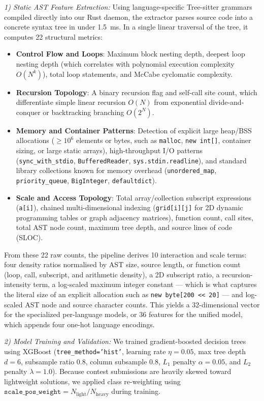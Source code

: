\documentclass[conference]{IEEEtran}
\begin{document}
\textit{1) Static AST Feature Extraction:} Using language-specific Tree-sitter grammars compiled directly into our Rust daemon, the extractor parses source code into a concrete syntax tree in under 1.5~ms. In a single linear traversal of the tree, it computes 22 structural metrics:
\begin{itemize}
    \item \textbf{Control Flow and Loops}: Maximum block nesting depth, deepest loop nesting depth (which correlates with polynomial execution complexity $O(N^k)$), total loop statements, and McCabe cyclomatic complexity.
    \item \textbf{Recursion Topology}: A binary recursion flag and self-call site count, which differentiate simple linear recursion $O(N)$ from exponential divide-and-conquer or backtracking branching $O(2^N)$.
    \item \textbf{Memory and Container Patterns}: Detection of explicit large heap/BSS allocations ($\ge 10^6$ elements or bytes, such as \texttt{malloc}, \texttt{new int[]}, container sizing, or large static arrays), high-throughput I/O patterns (\texttt{sync\_with\_stdio}, \texttt{BufferedReader}, \texttt{sys.stdin.readline}), and standard library collections known for memory overhead (\texttt{unordered\_map}, \texttt{priority\_queue}, \texttt{BigInteger}, \texttt{defaultdict}).
    \item \textbf{Scale and Access Topology}: Total array/collection subscript expressions (\texttt{a[i]}), chained multi-dimensional indexing (\texttt{grid[i][j]} for 2D dynamic programming tables or graph adjacency matrices), function count, call sites, total AST node count, maximum tree depth, and source lines of code (SLOC).
\end{itemize}
From these 22 raw counts, the pipeline derives 10 interaction and scale terms: four density ratios normalised by AST size, source length, or function count (loop, call, subscript, and arithmetic density), a 2D subscript ratio, a recursion-intensity term, a log-scaled maximum integer constant --- which is what captures the literal size of an explicit allocation such as \texttt{new byte[200 << 20]} --- and log-scaled AST node and source character counts. This yields a 32-dimensional vector for the specialized per-language models, or 36 features for the unified model, which appends four one-hot language encodings.

\textit{2) Model Training and Validation:}
We trained gradient-boosted decision trees using XGBoost (\texttt{tree\_method='hist'}, learning rate $\eta = 0.05$, max tree depth $d = 6$, subsample ratio $0.8$, column subsample $0.8$, $L_1$ penalty $\alpha = 0.05$, and $L_2$ penalty $\lambda = 1.0$). Because contest submissions are heavily skewed toward lightweight solutions, we applied class re-weighting using $\texttt{scale\_pos\_weight} = N_{\mathrm{light}} / N_{\mathrm{heavy}}$ during training.
\end{document}
